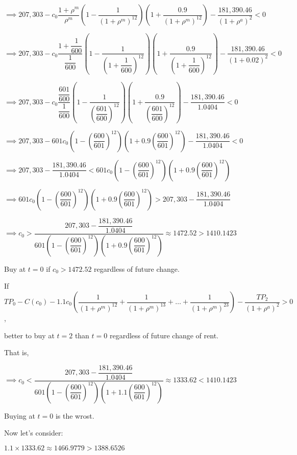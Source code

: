 \documentclass{article}
\begin{document}
$\implies207,303-c_{0}\dfrac{1+\rho^{m}}{\rho^{m}}\left(1-\dfrac{1}{\left(1+\rho^{m}\right)^{12}}\right)\left(1+\dfrac{0.9}{\left(1+\rho^{m}\right)^{12}}\right)-\dfrac{181,390.46}{\left(1+\rho^{a}\right)^{2}}<0$

$\implies207,303-c_{0}\dfrac{1+\dfrac{1}{600}}{\dfrac{1}{600}}\left(1-\dfrac{1}{\left(1+\dfrac{1}{600}\right)^{12}}\right)\left(1+\dfrac{0.9}{\left(1+\dfrac{1}{600}\right)^{12}}\right)-\dfrac{181,390.46}{\left(1+0.02\right)^{2}}<0$

$\implies207,303-c_{0}\dfrac{\dfrac{601}{600}}{\dfrac{1}{600}}\left(1-\dfrac{1}{\left(\dfrac{601}{600}\right)^{12}}\right)\left(1+\dfrac{0.9}{\left(\dfrac{601}{600}\right)^{12}}\right)-\dfrac{181,390.46}{1.0404}<0$

$\implies207,303-601c_{0}\left(1-\left(\dfrac{600}{601}\right)^{12}\right)\left(1+0.9\left(\dfrac{600}{601}\right)^{12}\right)-\dfrac{181,390.46}{1.0404}<0$

$\implies207,303-\dfrac{181,390.46}{1.0404}<601c_{0}\left(1-\left(\dfrac{600}{601}\right)^{12}\right)\left(1+0.9\left(\dfrac{600}{601}\right)^{12}\right)$

$\implies601c_{0}\left(1-\left(\dfrac{600}{601}\right)^{12}\right)\left(1+0.9\left(\dfrac{600}{601}\right)^{12}\right)>207,303-\dfrac{181,390.46}{1.0404}$

$\implies c_{0}>\dfrac{207,303-\dfrac{181,390.46}{1.0404}}{601\left(1-\left(\dfrac{600}{601}\right)^{12}\right)\left(1+0.9\left(\dfrac{600}{601}\right)^{12}\right)}\approx\boxed{1472.52}>1410.1423$

Buy at $t=0$ if $c_{0}>1472.52$ regardless of future change.

If $TP_{0}-C\left(c_{0}\right)-1.1c_{0}\left(\dfrac{1}{\left(1+\rho^{m}\right)^{12}}+\dfrac{1}{\left(1+\rho^{m}\right)^{13}}+\dots+\dfrac{1}{\left(1+\rho^{m}\right)^{23}}\right)-\dfrac{TP_{2}}{\left(1+\rho^{a}\right)^{2}}>0$, 

better to buy at $t=2$ than $t=0$ regardless of future change of rent.

That is,

$\implies c_{0}<\dfrac{207,303-\dfrac{181,390.46}{1.0404}}{601\left(1-\left(\dfrac{600}{601}\right)^{12}\right)\left(1+1.1\left(\dfrac{600}{601}\right)^{12}\right)}\approx\boxed{1333.62}<1410.1423$

Buying at $t=0$ is the wrost.

Now let's consider:

$1.1\times 1333.62\approx1466.9779>1388.6526$
\end{document}
